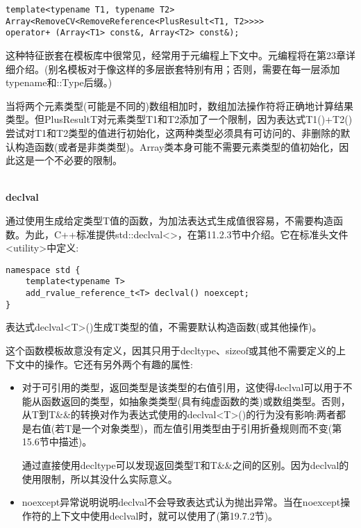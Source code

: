 \begin{lstlisting}[style=styleCXX]
template<typename T1, typename T2>
Array<RemoveCV<RemoveReference<PlusResult<T1, T2>>>>
operator+ (Array<T1> const&, Array<T2> const&);
\end{lstlisting}

这种特征嵌套在模板库中很常见，经常用于元编程上下文中。元编程将在第23章详细介绍。(别名模板对于像这样的多层嵌套特别有用；否则，需要在每一层添加typename和::Type后缀。)

当将两个元素类型(可能是不同的)数组相加时，数组加法操作符将正确地计算结果类型。但PlusResultT对元素类型T1和T2添加了一个限制，因为表达式T1()+T2()尝试对T1和T2类型的值进行初始化，这两种类型必须具有可访问的、非删除的默认构造函数(或者是非类类型)。Array类本身可能不需要元素类型的值初始化，因此这是一个不必要的限制。

\hspace*{\fill} \\ %
\noindent
\textbf{declval}

通过使用生成给定类型T值的函数，为加法表达式生成值很容易，不需要构造函数。为此，C++标准提供std::declval<>，在第11.2.3节中介绍。它在标准头文件<utility>中定义:

\begin{lstlisting}[style=styleCXX]
namespace std {
	template<typename T>
	add_rvalue_reference_t<T> declval() noexcept;
}
\end{lstlisting}

表达式declval<T>()生成T类型的值，不需要默认构造函数(或其他操作)。

这个函数模板故意没有定义，因其只用于decltype、sizeof或其他不需要定义的上下文中的操作。它还有另外两个有趣的属性:

\begin{itemize}
\item 
对于可引用的类型，返回类型是该类型的右值引用，这使得declval可以用于不能从函数返回的类型，如抽象类类型(具有纯虚函数的类)或数组类型。否则，从T到T\&\&的转换对作为表达式使用的declval<T>()的行为没有影响:两者都是右值(若T是一个对象类型)，而左值引用类型由于引用折叠规则而不变(第15.6节中描述)。

\begin{tcolorbox}[colback=webgreen!5!white,colframe=webgreen!75!black]
\hspace*{0.75cm}通过直接使用decltype可以发现返回类型T和T\&\&之间的区别。因为declval的使用限制，所以其没什么实际意义。
\end{tcolorbox}

\item 
noexcept异常说明说明declval不会导致表达式认为抛出异常。当在noexcept操作符的上下文中使用declval时，就可以使用了(第19.7.2节)。
\end{itemize}

